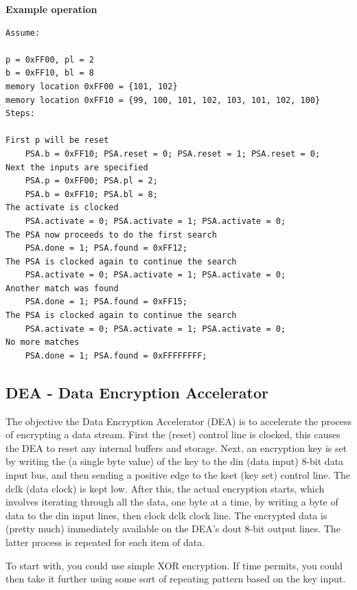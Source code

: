 \textbf{Example operation}
\begin{lstlisting}
Assume:

p = 0xFF00, pl = 2
b = 0xFF10, bl = 8
memory location 0xFF00 = {101, 102}
memory location 0xFF10 = {99, 100, 101, 102, 103, 101, 102, 100}
Steps:

First p will be reset
    PSA.b = 0xFF10; PSA.reset = 0; PSA.reset = 1; PSA.reset = 0;
Next the inputs are specified
    PSA.p = 0xFF00; PSA.pl = 2;
    PSA.b = 0xFF10; PSA.bl = 8;
The activate is clocked
    PSA.activate = 0; PSA.activate = 1; PSA.activate = 0;
The PSA now proceeds to do the first search
    PSA.done = 1; PSA.found = 0xFF12;
The PSA is clocked again to continue the search
    PSA.activate = 0; PSA.activate = 1; PSA.activate = 0;
Another match was found
    PSA.done = 1; PSA.found = 0xFF15;
The PSA is clocked again to continue the search
    PSA.activate = 0; PSA.activate = 1; PSA.activate = 0;
No more matches
    PSA.done = 1; PSA.found = 0xFFFFFFFF;
\end{lstlisting}


\subsection{DEA - Data Encryption Accelerator}
The objective the Data Encryption Accelerator (DEA) is to accelerate the process of encrypting a data stream. First the (reset) control line is clocked, this causes the DEA to reset any internal buffers and storage. Next, an encryption key is set by writing the (a single byte value) of the key to the din (data input) 8-bit data input bus, and then sending a positive edge to the kset (key set) control line. The dclk (data clock) is kept low. After this, the actual encryption starts, which involves iterating through all the data, one byte at a time, by writing a byte of data to the din input lines, then clock dclk clock line. The encrypted data is (pretty much) immediately available on the DEA's dout 8-bit output lines. The latter process is repeated for each item of data.

To start with, you could use simple XOR encryption. If time permits, you could then take it further using some sort of repeating pattern based on the key input.

